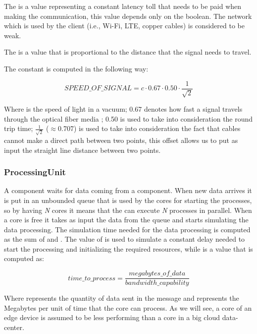 The  is a value representing a constant latency toll that needs to be paid when making the communication, this value depends only on the  boolean. The network which is used by the client (i.e., Wi-Fi, LTE, copper cables) is considered to be weak.

The  is a value that is proportional to the distance that the signal needs to travel.

The constant  is computed in the following way:

\[ SPEED\_OF\_SIGNAL = c \cdot 0.67 \cdot 0.50 \cdot \frac{1}{\sqrt{2}} \]

Where  is the speed of light in a vacuum; 0.67 denotes how fast a signal travels through the optical fiber media \cite{optical-fiber-latency}; 0.50 is used to take into consideration the round trip time; \(\frac{1}{\sqrt{2}}\) ($\approx$0.707) is used to take into consideration the fact that cables cannot make a direct path between two points, this offset allows us to put as input the straight line distance between two points.


\subsubsection{ProcessingUnit}
A  component waits for data coming from a  component. When new data arrives it is put in an unbounded queue that is used by the cores for starting the processes, so by having \textit{N} cores it means that the  can execute \textit{N} processes in parallel.
When a core is free it takes as input the data from the queue and starts simulating the data processing. The simulation time needed for the data processing is computed as the sum of  and . The value of  is used to simulate a constant delay needed to start the processing and initializing the required resources, while  is a value that is computed as:

\[ time\_to\_process = \frac{megabytes\_of\_data}{bandwidth\_capability} \]

Where  represents the quantity of data sent in the message and  represents the Megabytes per unit of time that the core can process. As we will see, a core of an edge device is assumed to be less performing than a core in a big cloud data-center.

